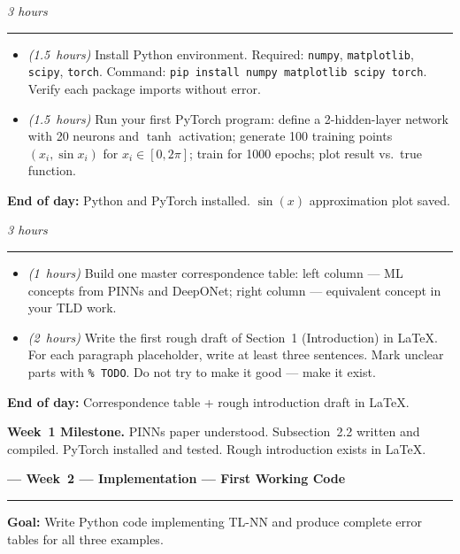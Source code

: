 \documentclass[12pt,a4paper]{article}
\newcommand{\hrs}[1]{\textit{\color{darkgray}(#1~hours)}}
\newcommand{\weekheading}[2]{%
  \vspace{0.8em}
  \noindent
  {\large\bfseries\color{midblue}--- Week~#1 ---
  \hfill\normalsize\normalfont\color{darkgray}#2}
  \vspace{0.2em}
  \\{\color{midblue}\rule{\linewidth}{0.6pt}}
  \vspace{0.3em}
}
\newcommand{\dayheading}[2]{%
  \vspace{0.3em}
  \noindent{\bfseries\color{darkblue}Day~#1}%
  \hfill{\small\color{darkgray}\textit{#2}}%
  \\[-0.4em]{\color{midgray}\rule{\linewidth}{0.4pt}}%
  \vspace{0.1em}
}
\begin{document}
\begin{tcolorbox}[daystyle]
\dayheading{6}{3 hours}
\begin{itemize}[leftmargin=1.8em,itemsep=3pt]
  \item[\color{midblue}$\bullet$]
    \hrs{1.5} Install Python environment. Required:
    \texttt{numpy}, \texttt{matplotlib}, \texttt{scipy},
    \texttt{torch}. Command:
    \texttt{pip install numpy matplotlib scipy torch}.
    Verify each package imports without error.
  \item[\color{midblue}$\bullet$]
    \hrs{1.5} Run your first PyTorch program: define a
    2-hidden-layer network with 20 neurons and $\tanh$
    activation; generate 100 training points
    $(x_i, \sin x_i)$ for $x_i \in [0, 2\pi]$;
    train for 1000 epochs; plot result vs.\ true function.
\end{itemize}
\noindent\textbf{End of day:}
Python and PyTorch installed.
$\sin(x)$ approximation plot saved.
\end{tcolorbox}

\begin{tcolorbox}[daystyle]
\dayheading{7}{3 hours}
\begin{itemize}[leftmargin=1.8em,itemsep=3pt]
  \item[\color{midblue}$\bullet$]
    \hrs{1} Build one master correspondence table:
    left column --- ML concepts from PINNs and DeepONet;
    right column --- equivalent concept in your TLD work.
  \item[\color{midblue}$\bullet$]
    \hrs{2} Write the first rough draft of Section~1
    (Introduction) in \LaTeX. For each paragraph
    placeholder, write at least three sentences.
    Mark unclear parts with \texttt{\%~TODO}.
    Do not try to make it good --- make it exist.
\end{itemize}
\noindent\textbf{End of day:}
Correspondence table + rough introduction draft in \LaTeX.
\end{tcolorbox}

\begin{tcolorbox}[milestonestyle]
\noindent\textbf{\color{darkred}Week~1 Milestone.}
PINNs paper understood. Subsection~2.2 written and compiled.
PyTorch installed and tested. Rough introduction exists
in \LaTeX.
\end{tcolorbox}

\weekheading{2}{Implementation --- First Working Code}

\noindent\textbf{Goal:}
Write Python code implementing TL-NN and produce
complete error tables for all three examples.
\end{document}
